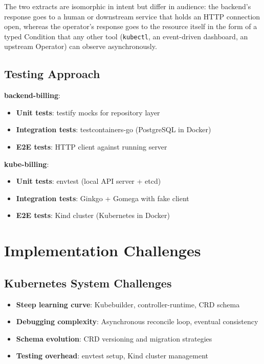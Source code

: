The two extracts are isomorphic in intent but differ in audience: the backend's response goes to a human or downstream service that holds an HTTP connection open, whereas the operator's response goes to the resource itself in the form of a typed Condition that any other tool (\texttt{kubectl}, an event-driven dashboard, an upstream Operator) can observe asynchronously.

\subsection{Testing Approach}

\textbf{backend-billing}:
\begin{itemize}
    \item \textbf{Unit tests}: testify mocks for repository layer
    \item \textbf{Integration tests}: testcontainers-go (PostgreSQL in Docker)
    \item \textbf{E2E tests}: HTTP client against running server
\end{itemize}

\textbf{kube-billing}:
\begin{itemize}
    \item \textbf{Unit tests}: envtest (local API server + etcd)
    \item \textbf{Integration tests}: Ginkgo + Gomega with fake client
    \item \textbf{E2E tests}: Kind cluster (Kubernetes in Docker)
\end{itemize}

\section{Implementation Challenges}

\subsection{Kubernetes System Challenges}

\begin{itemize}
    \item \textbf{Steep learning curve}: Kubebuilder, controller-runtime, CRD schema
    \item \textbf{Debugging complexity}: Asynchronous reconcile loop, eventual consistency
    \item \textbf{Schema evolution}: CRD versioning and migration strategies
    \item \textbf{Testing overhead}: envtest setup, Kind cluster management
\end{itemize}

